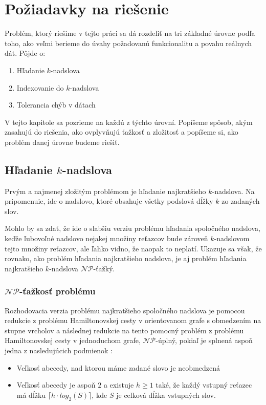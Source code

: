 \chapter{Požiadavky na riešenie}

Problém, ktorý riešime v tejto práci sa dá rozdeliť na tri základné úrovne podľa toho,
ako veľmi berieme do úvahy požadovanú funkcionalitu a povahu reálnych dát. Pôjde o:
\begin{enumerate}
    \item Hľadanie $k$-nadslova
    \item Indexovanie do $k$-nadslova
    \item Tolerancia chýb v dátach
\end{enumerate}
V tejto kapitole sa pozrieme na každú z týchto úrovní. Popíšeme spôsob, akým zasahujú
do riešenia, ako ovplyvňujú ťažkosť a zložitosť a popíšeme si, ako problém danej
úrovne budeme riešiť.

\section{Hľadanie $k$-nadslova}

Prvým a najmenej zložitým problémom je hľadanie najkratšieho $k$-nadslova. Na pripomenuie,
ide o nadslovo, ktoré obsahuje všetky podslová dĺžky $k$ zo zadaných slov.

Mohlo by sa zdať, že ide o slabšiu verziu problému hľadania
spoločného nadslova, keďže ľubovoľné nadslovo nejakej množiny reťazcov bude zároveň
$k$-nadslovom tejto množiny reťazcov, ale ľahko vidno, že naopak to neplatí.
Ukazuje sa však, že rovnako, ako problém hľadania najkratšieho nadslova, je aj
problém hľadania najkratšieho $k$-nadslova $\mathcal{NP}$-ťažký.

\subsection{$\mathcal{NP}$-ťažkosť problému}

Rozhodovacia verzia problému najkratšieho spoločného nadslova je pomocou redukcie
z problému Hamiltonovskej cesty v orientovanom grafe s obmedzením na stupne vrcholov
a následnej redukcie na tento pomocný problém z problému Hamiltonovskej cesty v jednoduchom
grafe, $\mathcal{NP}$-úplný, pokiaľ je splnená aspoň jedna z nasledujúcich podmienok \cite{superstring}:
\begin{itemize}
    \item Veľkosť abecedy, nad ktorou máme zadané slovo je neobmedzená
    \item Veľkosť abecedy je aspoň $2$ a existuje $h \ge 1$ také, že každý
          vstupný reťazec má dĺžku $\lceil h \cdot log_2 (S) \rceil$, kde $S$
          je celková dĺžka vstupných slov.
\end{itemize}

